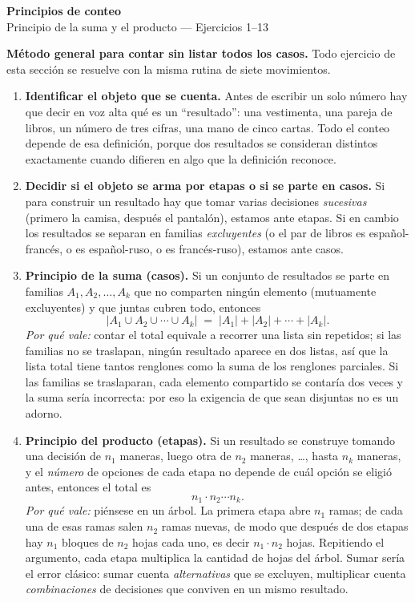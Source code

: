 \documentclass[11pt]{article}
\begin{document}
\begin{center}{\LARGE\bfseries Principios de conteo}\\[2pt]{\large Principio de la suma y el producto --- Ejercicios 1--13}\end{center}

\begin{teo}
\textbf{Método general para contar sin listar todos los casos.} Todo ejercicio de esta sección se resuelve con la misma rutina de siete movimientos.

\begin{enumerate}[leftmargin=*]
  \item \textbf{Identificar el objeto que se cuenta.} Antes de escribir un solo número hay que decir en voz alta qué es un ``resultado'': una vestimenta, una pareja de libros, un número de tres cifras, una mano de cinco cartas. Todo el conteo depende de esa definición, porque dos resultados se consideran distintos exactamente cuando difieren en algo que la definición reconoce.

  \item \textbf{Decidir si el objeto se arma por etapas o si se parte en casos.} Si para construir un resultado hay que tomar varias decisiones \emph{sucesivas} (primero la camisa, después el pantalón), estamos ante etapas. Si en cambio los resultados se separan en familias \emph{excluyentes} (o el par de libros es español-francés, o es español-ruso, o es francés-ruso), estamos ante casos.

  \item \textbf{Principio de la suma (casos).} Si un conjunto de resultados se parte en familias $A_1,A_2,\dots,A_k$ que no comparten ningún elemento (mutuamente excluyentes) y que juntas cubren todo, entonces
  \[
    |A_1\cup A_2\cup\cdots\cup A_k| \;=\; |A_1|+|A_2|+\cdots+|A_k|.
  \]
  \emph{Por qué vale:} contar el total equivale a recorrer una lista sin repetidos; si las familias no se traslapan, ningún resultado aparece en dos listas, así que la lista total tiene tantos renglones como la suma de los renglones parciales. Si las familias se traslaparan, cada elemento compartido se contaría dos veces y la suma sería incorrecta: por eso la exigencia de que sean disjuntas no es un adorno.

  \item \textbf{Principio del producto (etapas).} Si un resultado se construye tomando una decisión de $n_1$ maneras, luego otra de $n_2$ maneras, \dots, hasta $n_k$ maneras, y el \emph{número} de opciones de cada etapa no depende de cuál opción se eligió antes, entonces el total es
  \[
    n_1\cdot n_2\cdots n_k .
  \]
  \emph{Por qué vale:} piénsese en un árbol. La primera etapa abre $n_1$ ramas; de cada una de esas ramas salen $n_2$ ramas nuevas, de modo que después de dos etapas hay $n_1$ bloques de $n_2$ hojas cada uno, es decir $n_1\cdot n_2$ hojas. Repitiendo el argumento, cada etapa multiplica la cantidad de hojas del árbol. Sumar sería el error clásico: sumar cuenta \emph{alternativas} que se excluyen, multiplicar cuenta \emph{combinaciones} de decisiones que conviven en un mismo resultado.


\end{enumerate}
\end{teo}
\end{document}
